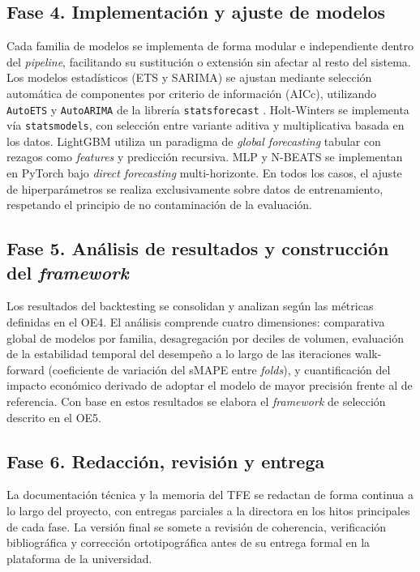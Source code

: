 \subsection{Fase 4. Implementación y ajuste de modelos}
\label{subsec:fase4}

Cada familia de modelos se implementa de forma modular e independiente dentro del \textit{pipeline}, facilitando su sustitución o extensión sin afectar al resto del sistema. Los modelos estadísticos (ETS y SARIMA) se ajustan mediante selección automática de componentes por criterio de información (AICc), utilizando \texttt{AutoETS} y \texttt{AutoARIMA} de la librería \texttt{statsforecast} \parencite{Hyndman2021}. Holt-Winters se implementa vía \texttt{statsmodels}, con selección entre variante aditiva y multiplicativa basada en los datos. LightGBM utiliza un paradigma de \textit{global forecasting} tabular con rezagos como \textit{features} y predicción recursiva. MLP y N-BEATS se implementan en PyTorch bajo \textit{direct forecasting} multi-horizonte. En todos los casos, el ajuste de hiperparámetros se realiza exclusivamente sobre datos de entrenamiento, respetando el principio de no contaminación de la evaluación.

\subsection{Fase 5. Análisis de resultados y construcción del \textit{framework}}
\label{subsec:fase5}

Los resultados del backtesting se consolidan y analizan según las métricas definidas en el OE4. El análisis comprende cuatro dimensiones: comparativa global de modelos por familia, desagregación por deciles de volumen, evaluación de la estabilidad temporal del desempeño a lo largo de las iteraciones walk-forward (coeficiente de variación del sMAPE entre \textit{folds}), y cuantificación del impacto económico derivado de adoptar el modelo de mayor precisión frente al de referencia. Con base en estos resultados se elabora el \textit{framework} de selección descrito en el OE5.

\subsection{Fase 6. Redacción, revisión y entrega}
\label{subsec:fase6}

La documentación técnica y la memoria del TFE se redactan de forma continua a lo largo del proyecto, con entregas parciales a la directora en los hitos principales de cada fase. La versión final se somete a revisión de coherencia, verificación bibliográfica y corrección ortotipográfica antes de su entrega formal en la plataforma de la universidad.
